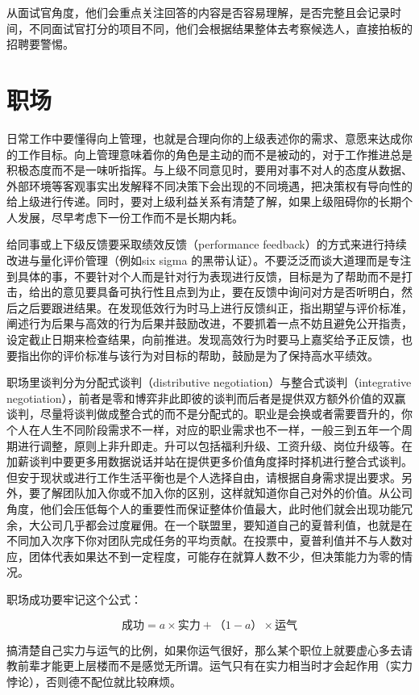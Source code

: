\documentclass[]{tufte-book}
\begin{document}
从面试官角度，他们会重点关注回答的内容是否容易理解，是否完整且会记录时间，不同面试官打分的项目不同，他们会根据结果整体去考察候选人，直接拍板的招聘要警惕。

\hypertarget{ux804cux573a}{%
\section{职场}\label{ux804cux573a}}

日常工作中要懂得向上管理，也就是合理向你的上级表述你的需求、意愿来达成你的工作目标。向上管理意味着你的角色是主动的而不是被动的，对于工作推进总是积极态度而不是一味听指挥。与上级不同意见时，要用对事不对人的态度从数据、外部环境等客观事实出发解释不同决策下会出现的不同境遇，把决策权有导向性的给上级进行传递。同时，要对上级利益关系有清楚了解，如果上级阻碍你的长期个人发展，尽早考虑下一份工作而不是长期内耗。

给同事或上下级反馈要采取绩效反馈（performance feedback）的方式来进行持续改进与量化评价管理（例如six sigma 的黑带认证）。不要泛泛而谈大道理而是专注到具体的事，不要针对个人而是针对行为表现进行反馈，目标是为了帮助而不是打击，给出的意见要具备可执行性且点到为止，要在反馈中询问对方是否听明白，然后之后要跟进结果。在发现低效行为时马上进行反馈纠正，指出期望与评价标准，阐述行为后果与高效的行为后果并鼓励改进，不要抓着一点不妨且避免公开指责，设定截止日期来检查结果，向前推进。发现高效行为时要马上嘉奖给予正反馈，也要指出你的评价标准与该行为对目标的帮助，鼓励是为了保持高水平绩效。

职场里谈判分为分配式谈判（distributive negotiation）与整合式谈判（integrative negotiation），前者是零和博弈非此即彼的谈判而后者是提供双方额外价值的双赢谈判，尽量将谈判做成整合式的而不是分配式的。职业是会换或者需要晋升的，你个人在人生不同阶段需求不一样，对应的职业需求也不一样，一般三到五年一个周期进行调整，原则上非升即走。升可以包括福利升级、工资升级、岗位升级等。在加薪谈判中要更多用数据说话并站在提供更多价值角度择时择机进行整合式谈判。但安于现状或进行工作生活平衡也是个人选择自由，请根据自身需求提出要求。另外，要了解团队加入你或不加入你的区别，这样就知道你自己对外的价值。从公司角度，他们会压低每个人的重要性而保证整体价值最大，此时他们就会出现功能冗余，大公司几乎都会过度雇佣。在一个联盟里，要知道自己的夏普利值，也就是在不同加入次序下你对团队完成任务的平均贡献。在投票中，夏普利值并不与人数对应，团体代表如果达不到一定程度，可能存在就算人数不少，但决策能力为零的情况。

职场成功要牢记这个公式：

\[成功=a×实力+（1-a）×运气\]

搞清楚自己实力与运气的比例，如果你运气很好，那么某个职位上就要虚心多去请教前辈才能更上层楼而不是感觉无所谓。运气只有在实力相当时才会起作用（实力悖论），否则德不配位就比较麻烦。
\end{document}
